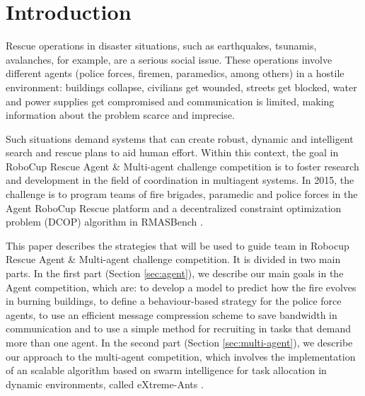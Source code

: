 \section{Introduction}
\label{sec:intro}

Rescue operations in disaster situations, such as earthquakes, tsunamis, avalanches, for example, are a serious social issue. These operations involve different agents (police forces, firemen, paramedics, among others) in a hostile environment: buildings collapse, civilians get wounded, streets get blocked, water and power supplies get compromised and communication is limited, making information about the problem scarce and imprecise.

Such situations demand systems that can create robust, dynamic and intelligent search and rescue plans to aid human effort. Within this context, the goal in RoboCup Rescue Agent \& Multi-agent challenge competition is to foster research and development in the field of coordination in multiagent systems. In 2015, the challenge is to program teams of fire brigades, paramedic and police forces in the Agent RoboCup Rescue platform \citep{Kitano2000} and a decentralized constraint optimization problem (DCOP) algorithm in RMASBench \citep{Kleiner+2013}. 


This paper describes the strategies that will be used to guide \teamname team in  Robocup Rescue Agent \& Multi-agent challenge competition. It is divided in two main parts. In the first part (Section \ref{sec:agent}), we describe our main goals in the Agent competition, which are: to develop a model to predict how the fire evolves in burning buildings, to define a behaviour-based strategy for the police force agents, to use an efficient message compression scheme to save bandwidth in communication and to use a simple  method for recruiting in tasks that demand more than one agent. In the second part (Section \ref{sec:multi-agent}), we describe our approach to the multi-agent competition, which involves the implementation of an scalable algorithm based on swarm intelligence for task allocation in dynamic environments, called eXtreme-Ants \citep{Santos&Bazzan2009optmas}.
